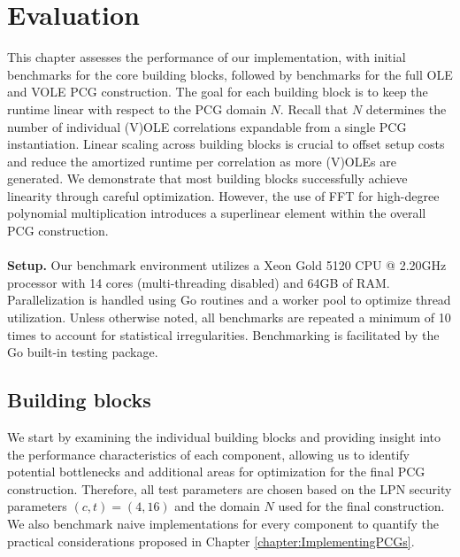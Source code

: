 \chapter{Evaluation}
This chapter assesses the performance of our implementation, with initial benchmarks for the core building blocks, followed by benchmarks for the full OLE and VOLE PCG construction. The goal for each building block is to keep the runtime linear with respect to the PCG domain $N$. Recall that $N$ determines the number of individual (V)OLE correlations expandable from a single PCG instantiation. Linear scaling across building blocks is crucial to offset setup costs and reduce the amortized runtime per correlation as more (V)OLEs are generated. We demonstrate that most building blocks successfully achieve linearity through careful optimization. However, the use of FFT for high-degree polynomial multiplication introduces a superlinear element within the overall PCG construction.
\\\\
\textbf{Setup.} Our benchmark environment utilizes a Xeon Gold 5120 CPU @ 2.20GHz processor with 14 cores (multi-threading disabled) and 64GB of RAM. Parallelization is handled using Go routines and a worker pool to optimize thread utilization. Unless otherwise noted, all benchmarks are repeated a minimum of 10 times to account for statistical irregularities. Benchmarking is facilitated by the Go built-in testing package. 

\section{Building blocks}
We start by examining the individual building blocks and providing insight into the performance characteristics of each component, allowing us to identify potential bottlenecks and additional areas for optimization for the final PCG construction. Therefore, all test parameters are chosen based on the LPN security parameters $(c,t)=(4,16)$ and the domain $N$ used for the final construction. We also benchmark naive implementations for every component to quantify the practical considerations proposed in Chapter \ref{chapter:ImplementingPCGs}.

